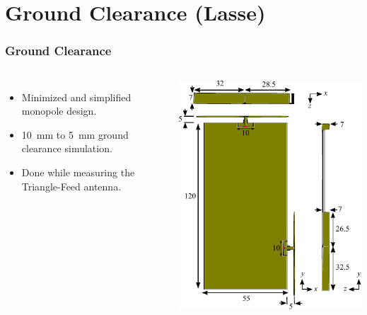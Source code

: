 \section[Ground Clearance]{Ground Clearance (Lasse)}
\def\legendfooter{\scriptsize{Upper: Top antenna. Lower: Side antenna. \textcolor{bb}{Monopole Sim}, \textcolor{gg}{Monopole Meas}, \textcolor{rr}{Triangle-Feed Meas}, Frequency in MHz.}}
\def\emptyline{\textcolor{white}{Empty}}

\begin{frame}[fragile]
  \frametitle{Ground Clearance}
  \begin{columns}[onlytextwidth,t]
      \begin{itemize}
      \item Minimized and simplified monopole design.
      \item \SI{10}{mm} to \SI{5}{mm} ground clearance simulation.
      \item Done while measuring the Triangle-Feed antenna.
      \end{itemize}
    \begin{center}
      \includegraphics[scale=0.7]{img/Lasse/3d_drawing_mini.pdf}
    \end{center}
  \end{columns}
\end{frame}

